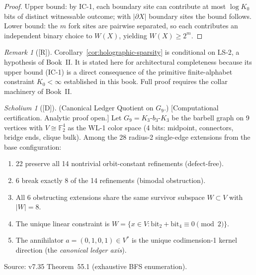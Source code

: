 \documentclass[12pt,oneside]{amsbook}
\theoremstyle{plain}
\theoremstyle{definition}
\theoremstyle{remark}
\newtheorem{remark}[theorem]{Remark}
\newtheorem{scholium}[theorem]{Scholium}
\newcommand{\status}[1]{\textup{[#1]}}
\begin{document}
\begin{proof}
Upper bound: by IC-1, each boundary site can contribute at most
$\log K_0$ bits of distinct witnessable outcome; with $|\partial X|$
boundary sites the bound follows.  Lower bound: the $m$ fork sites are
pairwise separated, so each contributes an independent binary choice to
$W(X)$, yielding $W(X) \geq 2^m$.
\end{proof}

\begin{remark}[\status{R}]
Corollary~\ref{cor:holographic-sparsity} is conditional on LS-2, a
hypothesis of Book~II.  It is stated here for architectural completeness
because its upper bound (IC-1) is a direct consequence of the primitive
finite-alphabet constraint $K_0 < \infty$ established in this book.
Full proof requires the collar machinery of Book~II.
\end{remark}


\begin{scholium}[\status{D}]\label{sch:ledger-quotient-G9}
\textup{(Canonical Ledger Quotient on $G_9$.)}  \textup{[Computational
certification.  Analytic proof open.]}
Let $G_9 = K_3\text{-}b_3\text{-}K_3$ be the barbell graph on 9
vertices with $V \cong \mathbb{F}_2^4$ as the WL-1 color space
(4 bits: midpoint, connectors, bridge ends, clique bulk).  Among the
28 radius-2 single-edge extensions from the base configuration:
\begin{enumerate}[label=\textup{(\arabic*)}]
  \item 22 preserve all 14 nontrivial orbit-constant refinements
        (defect-free).
  \item 6 break exactly 8 of the 14 refinements (bimodal obstruction).
  \item All 6 obstructing extensions share the same survivor subspace
        $W \subset V$ with $|W| = 8$.
  \item The unique linear constraint is
        $W = \{x \in V : \mathrm{bit}_2 + \mathrm{bit}_4 \equiv 0
        \pmod{2}\}$.
  \item The annihilator $a = (0,1,0,1) \in V^*$ is the unique
        codimension-1 kernel direction (the \emph{canonical ledger
        axis}).
\end{enumerate}
Source: v7.35 Theorem~55.1 (exhaustive BFS enumeration).
\end{scholium}
\end{document}
